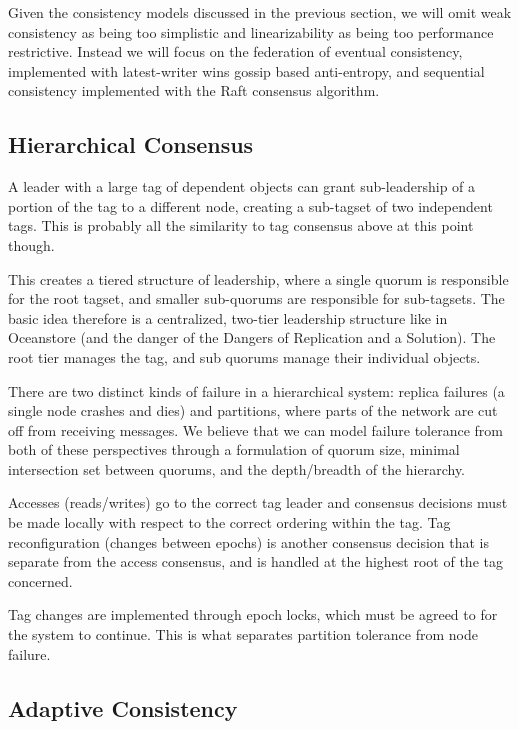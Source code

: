 \documentclass{article}
\begin{document}
Given the consistency models discussed in the previous section, we will omit weak consistency as being too simplistic and linearizability as being too performance restrictive. Instead we will focus on the federation of eventual consistency, implemented with latest-writer wins gossip based anti-entropy, and sequential consistency implemented with the Raft consensus algorithm.

\subsection{Hierarchical Consensus}

A leader with a large tag of dependent objects can grant sub-leadership of a portion of the tag to a different node, creating a sub-tagset of two independent tags. This is probably all the similarity to tag consensus above at this point though.

This creates a tiered structure of leadership, where a single quorum is responsible for the root tagset, and smaller sub-quorums are responsible for sub-tagsets. The basic idea therefore is a centralized, two-tier leadership structure like in Oceanstore (and the danger of the Dangers of Replication and a Solution). The root tier manages the tag, and sub quorums manage their individual objects.

There are two distinct kinds of failure in a hierarchical system: replica failures (a single node crashes and dies) and partitions, where parts of the network are cut off from receiving messages. We believe that we can model failure tolerance from both of these perspectives through a formulation of quorum size, minimal intersection set between quorums, and the depth/breadth of the hierarchy.

Accesses (reads/writes) go to the correct tag leader and consensus decisions must be made locally with respect to the correct ordering within the tag. Tag reconfiguration (changes between epochs) is another consensus decision that is separate from the  access consensus, and is handled at the highest root of the tag concerned.

Tag changes are implemented through epoch locks, which must be agreed to for the system to continue. This is what separates partition tolerance from node failure.

\subsection{Adaptive Consistency}
\end{document}
